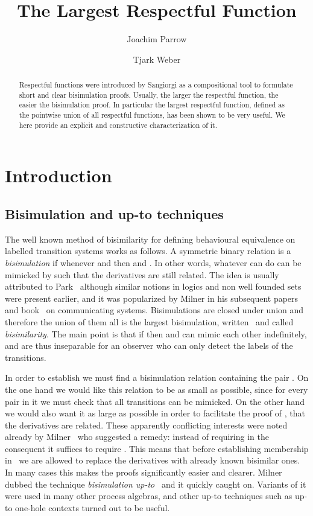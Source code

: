 \documentclass{CSML}
\theoremstyle{definition}
\begin{document}
\title[The Largest Respectful Function]{The Largest Respectful Function}
\author[J.~Parrow]{Joachim Parrow}
\author[T.~Weber]{Tjark Weber}
\address{Uppsala University, Sweden}

\begin{abstract}
  Respectful functions were introduced by Sangiorgi as a compositional
  tool to formulate short and clear bisimulation proofs.  Usually, the larger the respectful function, the easier the bisimulation proof.
  In particular the largest respectful function, defined as the
  pointwise union of all respectful functions, has been shown to be very useful.  We here
  provide an explicit and constructive characterization of it.
\end{abstract}

\maketitle

\section{Introduction}

\subsection{Bisimulation and up-to techniques}

The well known method of bisimilarity for defining behavioural
equivalence on labelled transition systems works as follows. A
symmetric binary relation  is a {\em bisimulation} if whenever  and  then  and .  In
other words, whatever  can do can be mimicked by  such that the
derivatives are still related.  The idea is usually attributed to
Park~\cite{Park1981} although similar notions in logics and non well
founded sets were present earlier, and it was popularized by Milner in
his subsequent papers and book~\cite{Milner1989} on communicating
systems.  Bisimulations are closed under union and therefore the union
of them all is the largest bisimulation, written~ and called
{\em bisimilarity}. The main point is that if  then 
and  can mimic each other indefinitely, and are thus inseparable
for an observer who can only detect the labels of the transitions.

In order to establish  we must find a bisimulation
relation containing the pair . On the one hand we would like
this relation to be as small as possible, since for every pair in it
we must check that all transitions can be mimicked. On the other hand
we would also want it as large as possible in order to facilitate the
proof of , that the derivatives are related. These apparently
conflicting interests were noted already by Milner~\cite{Milner1989}
who suggested a remedy: instead of requiring  in the
consequent it suffices to require . This means that before establishing membership
in~ we are allowed to replace the derivatives with already known
bisimilar ones. In many cases this makes the proofs significantly
easier and clearer. Milner dubbed the technique {\em bisimulation
  up-to~} and it quickly caught on. Variants of it were used
in many other process algebras, and other up-to techniques such as
up-to one-hole contexts
turned out to be useful.
\end{document}
